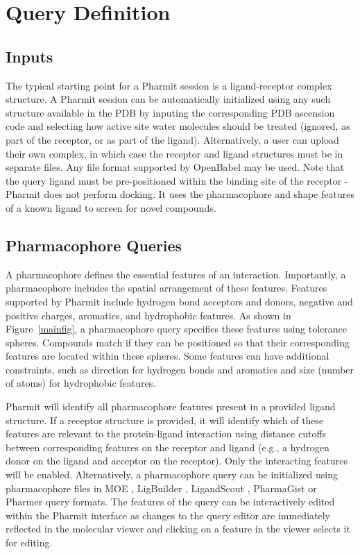 \section{Query Definition}


\subsection{Inputs}

The typical starting point for a Pharmit session is a ligand-receptor complex structure. A Pharmit session can be automatically initialized using any such structure available in the PDB by inputing the corresponding PDB ascension code and selecting how active site water molecules should be treated (ignored, as part of the receptor, or as part of the ligand).  Alternatively, a user can upload their own complex, in which case the receptor and ligand structures must be in separate files. Any file format supported by OpenBabel \cite{O_Boyle_2011} may be used.  Note that the query ligand must be pre-positioned within the binding site of the receptor - Pharmit does not perform docking. It uses the pharmacophore and shape features of a known ligand to screen for novel compounds.

\subsection{Pharmacophore Queries}
A pharmacophore \cite{Koes_2015rev,Yang_2010,Leach_2010} defines the essential features of an interaction. Importantly, a pharmacophore includes the spatial arrangement of these features. 
Features supported by Pharmit include hydrogen bond acceptors and donors,  negative and positive charges, aromatics, and hydrophobic features.
As shown in Figure~\ref{mainfig}, a pharmacophore query specifies these features using tolerance spheres.  Compounds match if they can be positioned so that their corresponding features are located within these spheres. Some features can have additional constraints, such as direction for hydrogen bonds and aromatics and size (number of atoms) for hydrophobic features.

Pharmit will identify all pharmacophore features present in a provided ligand structure. If a receptor structure is provided, it will identify which of these features are relevant to the protein-ligand interaction using distance cutoffs between corresponding features on the receptor and ligand (e.g., a hydrogen donor on the ligand and acceptor on the receptor). Only the interacting features will be enabled. Alternatively, a pharmacophore query can be initialized using pharmacophore files in MOE \cite{moe}, LigBuilder \cite{Wang_2000}, LigandScout \cite{Wolber_2005}, PharmaGist \cite{Schneidman_Duhovny_2008} or Pharmer \cite{Koes_2011} query formats.  The features of the query can be interactively edited within the Pharmit interface as changes to the query editor are immediately reflected in the molecular viewer and clicking on a feature in the viewer selects it for editing.


